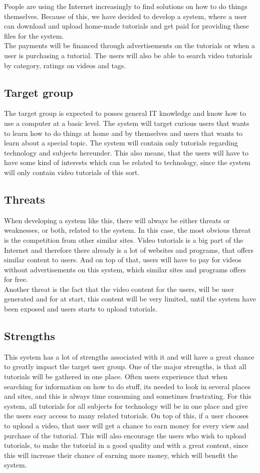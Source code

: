 People are using the Internet increasingly to find solutions on how to do things themselves. Because of this, we have decided to develop a system, where a user can download and upload home-made tutorials and get paid for providing these files for the system.\\ The payments will be financed through advertisements on the tutorials or when a user is purchasing a tutorial. The users will also be able to search video tutorials by category, ratings on videos and tags.

\subsection{Target group}
The target group is expected to posses general IT knowledge and know how to use a computer at a basic level. The system will target curious users that wants to learn how to do things at home and by themselves and users that wants to learn about a special topic. The system will contain only tutorials regarding technology and subjects hereunder. This also means, that the users will have to have some kind of interests which can be related to technology, since the system will only contain video tutorials of this sort.

\subsection{Threats}
When developing a system like this, there will always be either threats or weaknesses, or both, related to the system. In this case, the most obvious threat is the competition from other similar sites. Video tutorials is a big part of the Internet and therefore there already is a lot of websites and programs, that offers similar content to users. And on top of that, users will have to pay for videos without advertisements on this system, which similar sites and programs offers for free.\\ 
Another threat is the fact that the video content for the users, will be user generated and for at start, this content will be very limited, until the system have been exposed and users starts to upload tutorials.

\subsection{Strengths}
This system has a lot of strengths associated with it and will have a great chance to greatly impact the target user group. One of the major strengths, is that all tutorials will be gathered in one place. Often users experience that when searching for information on how to do stuff, its needed to look in several places and sites, and this is always time consuming and sometimes frustrating. For this system, all tutorials for all subjects for technology will be in one place and give the users easy access to many related tutorials. On top of this, if a user chooses to upload a video, that user will get a chance to earn money for every view and purchase of the tutorial. This will also encourage the users who wish to upload tutorials, to make the tutorial in a good quality and with a great content, since this will increase their chance of earning more money, which will benefit the system.

